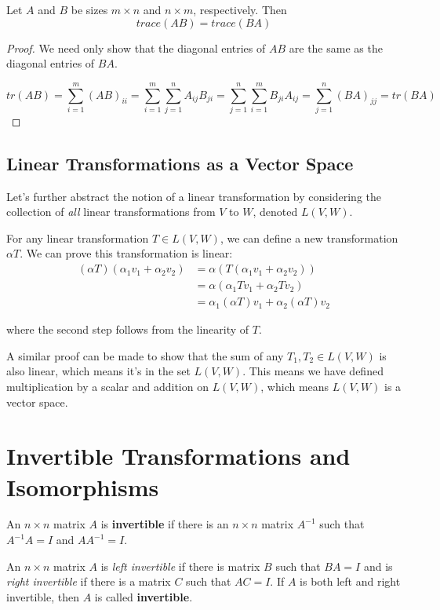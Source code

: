 \begin{theorem}
Let $A$ and $B$ be sizes $m \times n$ and $n \times m$, respectively. Then $$trace(AB) = trace(BA)$$
\end{theorem}

\begin{proof}
We need only show that the diagonal entries of $AB$ are the same as the diagonal entries of $BA$. 

$$tr(AB) = \sum_{i=1}^{m} (AB)_{ii} = \sum_{i=1}^{m} \sum_{j=1}^{n} A_{ij} B_{ji} = \sum_{j=1}^{n} \sum_{i=1}^{m} B_{ji} A_{ij} = \sum_{j=1}^{n} (BA)_{jj} = tr(BA)$$
\end{proof}

\subsection{Linear Transformations as a Vector Space}

Let's further abstract the notion of a linear transformation by considering the collection of \textit{all} linear transformations from $V$ to $W$, denoted $L(V, W)$. 

For any linear transformation $T \in L(V, W)$, we can define a new transformation $\alpha T$. We can prove this transformation is linear: 
$$
\begin{aligned} 
(\alpha T)(\alpha_{1} v_{1} + \alpha_{2} v_{2}) &= \alpha (T(\alpha_{1} v_{1} + \alpha_{2} v_{2})) \\
&= \alpha (\alpha_{1}Tv_{1} + \alpha_{2}Tv_{2}) \\
&= \alpha_{1} (\alpha T) v_{1} + \alpha_{2} (\alpha T) v_{2}
\end{aligned}
$$

where the second step follows from the linearity of $T$. 

A similar proof can be made to show that the sum of any $T_{1}, T_{2} \in L(V, W)$ is also linear, which means it's in the set $L(V, W)$. This means we have defined multiplication by a scalar and addition on $L(V, W)$, which means $L(V, W)$ is a vector space. 

\section{Invertible Transformations and Isomorphisms}
\begin{definition}
An $n \times n$ matrix $A$ is \textbf{invertible} if there is an $n \times n$ matrix $A^{-1}$ such that $A^{-1}A = I$ and $AA^{-1} = I$. 

An $n \times n$ matrix $A$ is \textit{left invertible} if there is matrix $B$ such that $BA = I$ and is \textit{right invertible} if there is a matrix $C$ such that $AC = I$. If $A$ is both left and right invertible, then $A$ is called \textbf{invertible}. 
\end{definition}

